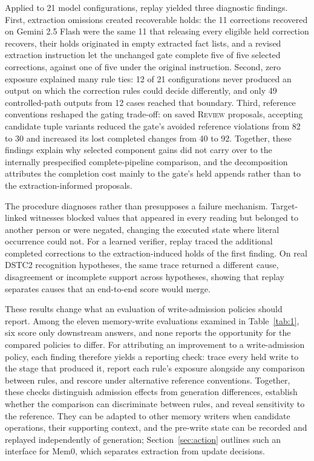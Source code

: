 \documentclass[acmsmall,review]{acmart}
\newcommand{\review}{\textsc{Review}}
\begin{document}
Applied to 21 model configurations, replay yielded three diagnostic findings. First, extraction omissions created recoverable holds: the 11 corrections recovered on Gemini 2.5 Flash were the same 11 that releasing every eligible held correction recovers, their holds originated in empty extracted fact lists, and a revised extraction instruction let the unchanged gate complete five of five selected corrections, against one of five under the original instruction. Second, zero exposure explained many rule ties: 12 of 21 configurations never produced an output on which the correction rules could decide differently, and only 49 controlled-path outputs from 12 cases reached that boundary. Third, reference conventions reshaped the gating trade-off: on saved \review{} proposals, accepting candidate tuple variants reduced the gate's avoided reference violations from 82 to 30 and increased its lost completed changes from 40 to 92. Together, these findings explain why selected component gains did not carry over to the internally prespecified complete-pipeline comparison, and the decomposition attributes the completion cost mainly to the gate's held appends rather than to the extraction-informed proposals.

The procedure diagnoses rather than presupposes a failure mechanism. Target-linked witnesses blocked values that appeared in every reading but belonged to another person or were negated, changing the executed state where literal occurrence could not. For a learned verifier, replay traced the additional completed corrections to the extraction-induced holds of the first finding. On real DSTC2 recognition hypotheses, the same trace returned a different cause, disagreement or incomplete support across hypotheses, showing that replay separates causes that an end-to-end score would merge.

These results change what an evaluation of write-admission policies should report. Among the eleven memory-write evaluations examined in Table~\ref{tab:1}, six score only downstream answers, and none reports the opportunity for the compared policies to differ. For attributing an improvement to a write-admission policy, each finding therefore yields a reporting check: trace every held write to the stage that produced it, report each rule's exposure alongside any comparison between rules, and rescore under alternative reference conventions. Together, these checks distinguish admission effects from generation differences, establish whether the comparison can discriminate between rules, and reveal sensitivity to the reference. They can be adapted to other memory writers when candidate operations, their supporting context, and the pre-write state can be recorded and replayed independently of generation; Section~\ref{sec:action} outlines such an interface for Mem0, which separates extraction from update decisions.
\end{document}
